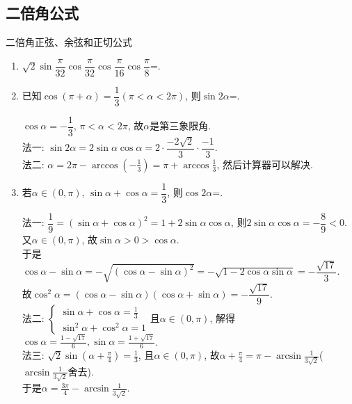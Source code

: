 \subsection{二倍角公式}
\zsd 二倍角正弦、余弦和正切公式


\begin{enumerate}
\item $\sqrt{2}\sin\dfrac{\pi}{32}\cos\dfrac{\pi}{32}\cos\dfrac{\pi}{16}\cos\dfrac{\pi}{8}$=. 

\item 已知$\cos(\pi+\alpha)=\dfrac{1}{3}(\pi<\alpha<2\pi)$, 则$\sin2\alpha$=. 
\begin{jieda}
$\cos\alpha=-\dfrac{1}{3}$, $\pi<\alpha<2\pi$, 故$\alpha$是第三象限角. \\
法一: $\sin2\alpha=2\sin\alpha\cos\alpha=2\cdot\dfrac{-2\sqrt{2}}{3}\cdot\dfrac{-1}{3}$. \\
法二: $\alpha=2\pi-\arccos(-\frac{1}{3})=\pi+\arccos\frac{1}{3}$, 然后计算器可以解决. 
\end{jieda}


\item 若$\alpha\in(0,\pi)$, $\sin\alpha+\cos\alpha=\dfrac{1}{3}$, 则$\cos2\alpha$=. 
\begin{jieda}
法一: $\dfrac{1}{9}=(\sin\alpha+\cos\alpha)^2=1+2\sin\alpha\cos\alpha$, 则$2\sin\alpha\cos\alpha=-\dfrac{8}{9}<0$. \\
又$\alpha\in(0,\pi)$, 故$\sin\alpha>0>\cos\alpha$. \\
于是$\cos\alpha-\sin\alpha=-\sqrt{(\cos\alpha-\sin\alpha)^2}=-\sqrt{1-2\cos\alpha\sin\alpha}=-\dfrac{\sqrt{17}}{3}$. \\
故$\cos^2\alpha=(\cos\alpha-\sin\alpha)(\cos\alpha+\sin\alpha)=-\dfrac{\sqrt{17}}{9}$. \\
法二: $\begin{cases}
\sin\alpha+\cos\alpha=\frac{1}{3}\\
\sin^2\alpha+\cos^2\alpha=1
\end{cases}$且$\alpha\in(0,\pi)$, 解得$\cos\alpha=\frac{1-\sqrt{17}}{6},\sin\alpha=\frac{1+\sqrt{17}}{6}$. \\
法三: $\sqrt{2}\sin(\alpha+\frac{\pi}{4})=\frac{1}{3}$, 且$\alpha\in(0,\pi)$, 
故$\alpha+\frac{\pi}{4}=\pi-\arcsin\frac{1}{3\sqrt{2}}$($\arcsin\frac{1}{3\sqrt{2}}$舍去).\\
于是$\alpha=\frac{3\pi}{4}-\arcsin\frac{1}{3\sqrt{2}}$. 
\end{jieda}


\end{enumerate}
